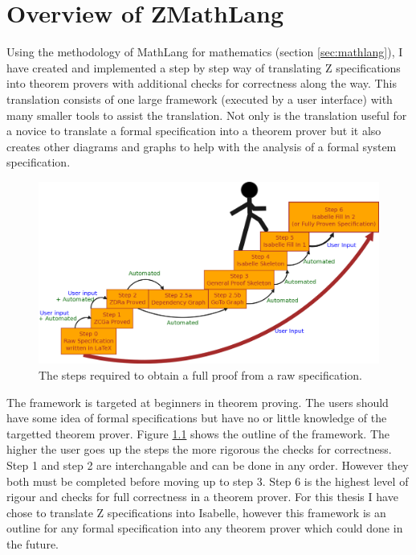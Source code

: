 
\chapter{Overview of ZMathLang}
\label{ch:design}

Using the methodology of MathLang for mathematics (section \ref{sec:mathlang}),
I have created and implemented a step by step way of translating Z
specifications into theorem provers with additional checks for correctness along
the way. This translation consists of one large framework (executed by a user
interface) with many smaller tools to assist the translation. Not only is the
translation useful for a novice to translate a formal specification into a
theorem prover but it also creates other diagrams and graphs to help with the
analysis of a formal system specification.

\begin{figure}[H]
 \begin{center}
 \includegraphics [width=12cm]{Figures/Design/mathlangsteps.png}
 \caption{The steps required to obtain a full proof from a raw specification.}
 \label{fig:steps}
\end{center}
\end{figure} 

The framework is targeted at beginners in theorem proving. The users should have
some idea of formal specifications but have no or little knowledge of the
targetted theorem prover. Figure \ref{fig:steps} shows the outline of the
framework. The higher the user goes up the steps the more rigorous the checks
for correctness. Step 1 and step 2 are interchangable and can be done in any
order. However they both must be completed before moving up to step 3. Step 6 is
the highest level of rigour and checks for full correctness in a theorem prover.
For this thesis I have chose to translate Z specifications into Isabelle,
however this framework is an outline for any formal specification into any
theorem prover which could done in the future.

